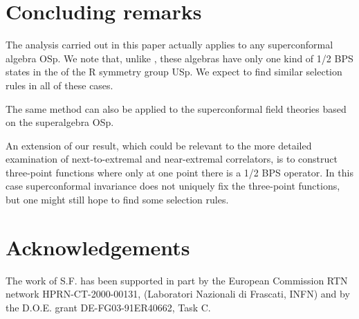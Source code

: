 \documentclass[a4paper,11pt]{article}
\begin{document}
\section*{Concluding remarks}
The analysis carried out in this paper actually applies to any \coordHE{}  \coordHE{}
superconformal algebra OSp\coordHE{}. We note that, unlike \coordHE{}, these
algebras have only one kind of 1/2 BPS states in the \myHighlight{$[0,\ldots,0,N]$}\coordHE{} of the
R symmetry group USp\coordHE{}. We expect to find similar selection rules in all of
these cases.

The same method can also be applied to the \coordHE{}  \coordHE{} superconformal field
theories based on the superalgebra OSp\coordHE{}.

An extension of our result, which could be relevant to the more detailed
examination of next-to-extremal and near-extremal correlators, is to construct
three-point functions where only at one point there is a 1/2 BPS operator.
In this case superconformal invariance does not uniquely fix the three-point
functions, but one might still hope to find some selection rules.


\section*{Acknowledgements}
The work of S.F. has been supported in part by the European Commission RTN
network HPRN-CT-2000-00131, (Laboratori Nazionali di Frascati, INFN) and by the
D.O.E. grant DE-FG03-91ER40662, Task C.
\end{document}
